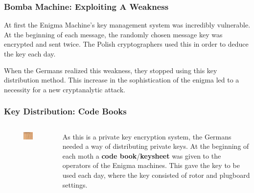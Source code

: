\documentclass{beamer}
\newcommand{\<}{\langle}
\renewcommand{\>}{\rangle}
\begin{document}
\begin{frame}
\frametitle{Bomba Machine: Exploiting A Weakness}

At first the Enigma Machine's key management system was incredibly vulnerable. At the beginning of each message, the randomly chosen message key was encrypted and sent twice. The Polish cryptographers used this in order to deduce the key each day. \newline

When the Germans realized this weakness, they stopped using this key distribution method. This increase in the sophistication of the enigma led to a necessity for a new cryptanalytic attack.
\end{frame}


\begin{frame}
\frametitle{Key Distribution: Code Books}

\begin{columns}
\begin{column}{.55\textwidth}
\begin{figure}
\includegraphics[scale=3.5]{IMG/keysheet}
\end{figure}
\end{column}
\begin{column}{.45\textwidth}
As this is a private key encryption system, the Germans needed a way of distributing private keys. At the beginning of each moth a \textbf{code book}/\textbf{keysheet} was given to the operators of the Enigma machines. This gave the key to be used each day, where the key consisted of rotor and plugboard settings. 
\end{column}
\end{columns}
\end{frame}
\end{document}
